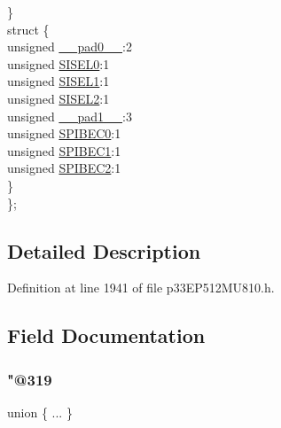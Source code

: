 \begin{DoxyCompactItemize}
\begin{tabbing}
\>\} \\
\>struct \{\\
\>\>unsigned \hyperlink{structtag_s_p_i2_s_t_a_t_b_i_t_s_adf71f3d8410c1f1dbbc96680a92c49af}{\_\_pad0\_\_}:2\\
\>\>unsigned \hyperlink{structtag_s_p_i2_s_t_a_t_b_i_t_s_a718402bd0465fbc4fd6a2a312afc68cc}{SISEL0}:1\\
\>\>unsigned \hyperlink{structtag_s_p_i2_s_t_a_t_b_i_t_s_a70b3f81521b4df5d2bdc98a48ab8a777}{SISEL1}:1\\
\>\>unsigned \hyperlink{structtag_s_p_i2_s_t_a_t_b_i_t_s_a9a7815799509b1ff427025989182aa2a}{SISEL2}:1\\
\>\>unsigned \hyperlink{structtag_s_p_i2_s_t_a_t_b_i_t_s_acaf2d0924a107ec6e8d2e31febaf66f9}{\_\_pad1\_\_}:3\\
\>\>unsigned \hyperlink{structtag_s_p_i2_s_t_a_t_b_i_t_s_aa9b4c159cfcb7a8c3eaf3369b146b3a2}{SPIBEC0}:1\\
\>\>unsigned \hyperlink{structtag_s_p_i2_s_t_a_t_b_i_t_s_ae1c44e4e7fb1aec2d5856ba13ed7851b}{SPIBEC1}:1\\
\>\>unsigned \hyperlink{structtag_s_p_i2_s_t_a_t_b_i_t_s_a995b2cfafb90409d16825fc4d4b23a35}{SPIBEC2}:1\\
\>\} \\
\}; \\

\end{tabbing}\end{DoxyCompactItemize}


\subsection{Detailed Description}


Definition at line 1941 of file p33\+E\+P512\+M\+U810.\+h.



\subsection{Field Documentation}
\mbox{\label{structtag_s_p_i2_s_t_a_t_b_i_t_s_a4b32ce11615988e227b41ceb0503e736}} 
\subsubsection{\texorpdfstring{"@319}{@319}}
{\footnotesize\ttfamily union \{ ... \} }

\mbox{\label{structtag_s_p_i2_s_t_a_t_b_i_t_s_adf71f3d8410c1f1dbbc96680a92c49af}} 
